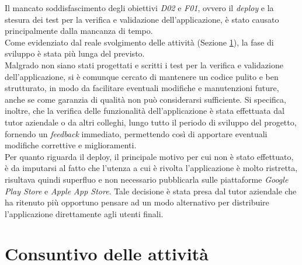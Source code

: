 \noindent Il mancato soddisfascimento degli obiettivi \emph{D02} e \emph{F01}, ovvero il \emph{deploy} e la stesura dei test per la verifica e validazione dell'applicazione, è stato causato principalmente dalla mancanza di tempo. \\
Come evidenziato dal reale svolgimento delle attività (Sezione \ref{sec:consultivo-attivita}), la fase di sviluppo è stata più lunga del previsto.\\
Malgrado non siano stati progettati e scritti i test per la verifica e validazione dell'applicazione, si è comunque cercato di mantenere un codice pulito e ben strutturato, in modo da facilitare eventuali modifiche e manutenzioni future, anche se come garanzia di qualità non può considerarsi sufficiente.
Si specifica, inoltre, che la verifica delle funzionalità dell'applicazione è stata effettuata dal tutor aziendale o da altri colleghi, lungo tutto il periodo di sviluppo del progetto, fornendo un \emph{feedback} immediato, permettendo così di apportare eventuali modifiche correttive e miglioramenti.\\
Per quanto riguarda il \gls{deploy}\glsoccur, il principale motivo per cui non è stato effettuato, è da imputarsi al fatto che l'utenza a cui è rivolta l'applicazione è molto ristretta, risultava quindi superfluo e non necessario pubblicarla sulle piattaforme \emph{Google Play Store} e \emph{Apple App Store}. Tale decisione è stata presa dal tutor aziendale che ha ritenuto più opportuno pensare ad un modo alternativo per distribuire l'applicazione direttamente agli utenti finali.

\newpage

\section{Consuntivo delle attività}
\label{sec:consultivo-attivita}


